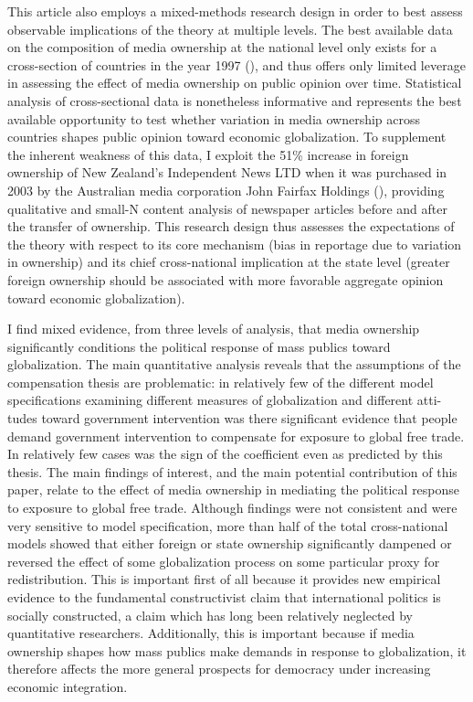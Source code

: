 \documentclass[12pt]{report}
\begin{document}
This article also employs a mixed-methods research design in order to best assess observable implications of the theory at
multiple levels. The best available data on the composition of media ownership at the national level only exists for a cross-section of countries in the year 1997 (\citealt{Djankov:2001th}), and thus offers only limited leverage in assessing the effect of media ownership on public opinion over time. Statistical analysis of cross-sectional data is nonetheless informative and represents the best available opportunity to test whether variation in media ownership across countries shapes public opinion toward economic globalization. To supplement the inherent weakness of this data, I exploit the 51\% increase in foreign ownership of New Zealand's Independent News LTD when it was purchased in 2003 by the Australian media corporation John Fairfax Holdings (\citealt{Rosenberg:2008wu}), providing qualitative and small-N content analysis of newspaper articles before and after the transfer of ownership. This research design thus assesses the expectations of the theory with respect to its core mechanism (bias in reportage due to variation in ownership) and its chief cross-national implication at the state level (greater foreign ownership should be associated with more favorable aggregate opinion toward economic globalization).

I find mixed evidence, from three levels of analysis, that media ownership significantly conditions
the political response of mass publics toward globalization. The main quantitative analysis reveals
that the assumptions of the compensation thesis are problematic: in relatively few of the different
model specifications examining different measures of globalization and different atti- tudes toward
government intervention was there significant evidence that people demand government intervention to
compensate for exposure to global free trade. In relatively few cases was the sign of the
coefficient even as predicted by this thesis. The main findings of interest, and the main potential
contribution of this paper, relate to the effect of media ownership in mediating the political
response to exposure to global free trade. Although findings were not consistent and were very
sensitive to model specification, more than half of the total cross-national models showed that
either foreign or state ownership significantly dampened or reversed the effect of some
globalization process on some particular proxy for redistribution. This is important first of all because it provides new empirical evidence to the fundamental constructivist claim that international politics is socially constructed, a claim which has long been relatively neglected by quantitative researchers. Additionally, this is important because if media ownership shapes how mass publics make demands in response to globalization, it therefore affects the more general prospects for democracy under increasing economic integration.
\end{document}

